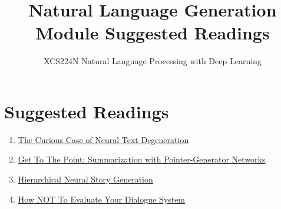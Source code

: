 \documentclass{article}
\title{Natural Language Generation Module Suggested Readings}
\author{XCS224N Natural Language Processing with Deep Learning}
\date{}
\begin{document}
\maketitle

\section{Suggested Readings}
\begin{enumerate}
    \item \href{https://arxiv.org/pdf/1904.09751.pdf}{The Curious Case of Neural Text Degeneration}
    \item \href{https://arxiv.org/pdf/1704.04368.pdf}{Get To The Point: Summarization with Pointer-Generator Networks}
    \item \href{https://arxiv.org/pdf/1805.04833.pdf}{Hierarchical Neural Story Generation}
    \item \href{https://arxiv.org/pdf/1603.08023.pdf}{How NOT To Evaluate Your Dialogue System}
\end{enumerate}
\end{document}

